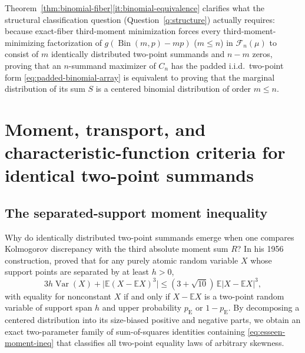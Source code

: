 \documentclass[11pt]{article}
\numberwithin{equation}{section}
\theoremstyle{definition}
\theoremstyle{remark}
\DeclareMathOperator{\Var}{Var}
\DeclareMathOperator{\Bin}{Bin}
\newcommand{\E}{\mathbb E}
\newcommand{\pe}{p_{\mathrm E}}
\begin{document}
Theorem~\ref{thm:binomial-fiber}\ref{it:binomial-equivalence} clarifies what
the structural classification question (Question~\ref{q:structure}) actually
requires: because exact-fiber third-moment minimization forces every
third-moment-minimizing factorization of $g(\Bin(m,p)-mp)$ ($m\le n$) in
$\mathcal F_n(\mu)$ to consist of $m$ identically distributed two-point
summands and $n-m$ zeros, proving that an $n$-summand maximizer of $C_n$ has
the padded i.i.d.\ two-point form \eqref{eq:padded-binomial-array} is
equivalent to proving that the marginal distribution of its sum $S$ is a
centered binomial distribution of order $m\le n$.

\section{Moment, transport, and characteristic-function criteria for identical two-point summands}\label{sec:criteria}

\subsection{The separated-support moment inequality}

Why do identically distributed two-point summands emerge when one compares
Kolmogorov discrepancy with the third absolute moment sum $R$? In his 1956
construction, \citet[Lemma~1, pp.~162--163]{Esseen1956} proved that for any
purely atomic random variable $X$ whose support points are separated by at
least $h>0$,
\begin{equation}\label{eq:esseen-moment-ineq}
 3h\Var(X)+\bigl|\E(X-\E X)^3\bigr|
 \le (3+\sqrt{10})\,\E|X-\E X|^3,
\end{equation}
with equality for nonconstant $X$ if and only if $X-\E X$ is a two-point
random variable of support span $h$ and upper probability $\pe$ or $1-\pe$.
By decomposing a centered distribution into its size-biased positive and
negative parts, we obtain an exact two-parameter family of sum-of-squares
identities containing \eqref{eq:esseen-moment-ineq} that classifies all
two-point equality laws of arbitrary skewness.
\end{document}
